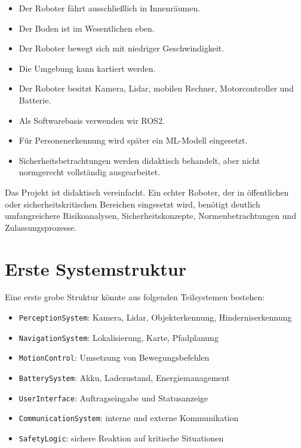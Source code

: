 \begin{itemize}
    \item Der Roboter fährt ausschließlich in Innenräumen.
    \item Der Boden ist im Wesentlichen eben.
    \item Der Roboter bewegt sich mit niedriger Geschwindigkeit.
    \item Die Umgebung kann kartiert werden.
    \item Der Roboter besitzt Kamera, Lidar, mobilen Rechner, Motorcontroller und Batterie.
    \item Als Softwarebasis verwenden wir ROS2.
    \item Für Personenerkennung wird später ein ML-Modell eingesetzt.
    \item Sicherheitsbetrachtungen werden didaktisch behandelt, aber nicht normgerecht vollständig ausgearbeitet.
\end{itemize}

\begin{hinweisbox}
Das Projekt ist didaktisch vereinfacht. Ein echter Roboter, der in öffentlichen oder sicherheitskritischen Bereichen eingesetzt wird, benötigt deutlich umfangreichere Risikoanalysen, Sicherheitskonzepte, Normenbetrachtungen und Zulassungsprozesse.
\end{hinweisbox}

\section{Erste Systemstruktur}
Eine erste grobe Struktur könnte aus folgenden Teilsystemen bestehen:

\begin{itemize}
    \item \texttt{PerceptionSystem}: Kamera, Lidar, Objekterkennung, Hinderniserkennung
    \item \texttt{NavigationSystem}: Lokalisierung, Karte, Pfadplanung
    \item \texttt{MotionControl}: Umsetzung von Bewegungsbefehlen
    \item \texttt{BatterySystem}: Akku, Ladezustand, Energiemanagement
    \item \texttt{UserInterface}: Auftragseingabe und Statusanzeige
    \item \texttt{CommunicationSystem}: interne und externe Kommunikation
    \item \texttt{SafetyLogic}: sichere Reaktion auf kritische Situationen
\end{itemize}


